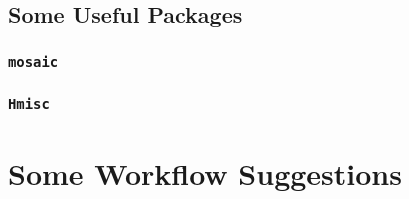 \subsection{Some Useful Packages}

\subsubsection*{\texttt{mosaic}}

\subsubsection*{\texttt{Hmisc}}

\section{Some Workflow Suggestions}

